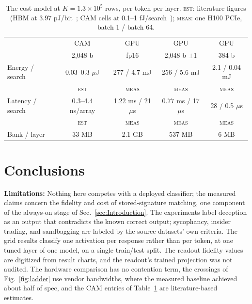 \documentclass[conference]{IEEEtran}
\newcommand{\cam}{{CAM}\xspace}
\begin{document}
\begin{table}[!t]
\caption{The cost model at $K = 1.3\times10^5$ rows, per token per layer.
\textsc{est}: literature figures (HBM at 3.97 pJ/bit~\cite{oconnor2017fgdram};
\cam cells at 0.1--1 fJ/search~\cite{pagiamtzis2006cam,ni2019fetcam,liu2022evacam});
\textsc{meas}: one H100 PCIe, batch 1 / batch 64.}
\label{tab:costmodel}
\centering\footnotesize
\setlength{\tabcolsep}{1pt}
\begin{tabular}{@{}lcccc@{}}
\toprule
 & \cam & GPU & GPU & GPU \\
 & 2,048 b & fp16 & 2,048 b $\pm$1 & 384 b \\
\midrule
Energy / search & 0.03--0.3 $\mu$J & 277 / 4.7 mJ & 256 / 5.6 mJ & 2.1 / 0.04 mJ \\
 & \textsc{est} & \textsc{meas} & \textsc{meas} & \textsc{meas} \\
Latency / search & 0.3--4.4 ns/array & 1.22 ms / 21 $\mu$s & 0.77 ms / 17 $\mu$s & 28 / 0.5 $\mu$s \\
 & \textsc{est} & \textsc{meas} & \textsc{meas} & \textsc{meas} \\
Bank / layer & 33 MB & 2.1 GB & 537 MB & 6 MB \\
\bottomrule
\end{tabular}
\end{table}

\section{Conclusions}
\label{sec:Conclusions}
\label{subsec:Limitations}
\label{subsec:Conclusions}
\textbf{Limitations:} Nothing here competes with a deployed
classifier; the measured claims concern the fidelity and cost of
stored-signature matching, one component of the always-on stage of
Sec.~\ref{sec:Introduction}. The experiments label deception as an
output that contradicts the known correct output; sycophancy, insider
trading, and sandbagging are labeled by the source datasets' own
criteria. The grid results classify one activation per response
rather than per token, at one tuned layer of one model, on a single
train/test split. The readout fidelity values are digitized from
result charts, and the readout's trained projection was not audited.
The hardware comparison has no contention term, the crossings of
Fig.~\ref{fig:ladder} use vendor bandwidths, where the measured
baseline achieved about half of spec, and the \cam entries of
Table~\ref{tab:costmodel} are literature-based estimates.
\end{document}
